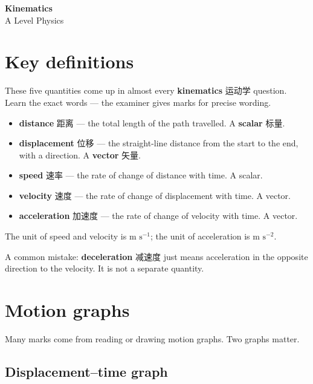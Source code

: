 \documentclass[11pt]{article}
\begin{document}
\begin{center}
  {\LARGE\bfseries Kinematics}\\[0.35em]
  {\large A Level Physics}
\end{center}
\vspace{0.6em}

\section*{Key definitions}

These five quantities come up in almost every \textbf{kinematics} 运动学 question. Learn the exact words — the examiner gives marks for precise wording.

\begin{itemize}
\item \textbf{distance} 距离 — the total length of the path travelled. A \textbf{scalar} 标量.

\item \textbf{displacement} 位移 — the straight-line distance from the start to the end, with a direction. A \textbf{vector} 矢量.

\item \textbf{speed} 速率 — the rate of change of distance with time. A scalar.

\item \textbf{velocity} 速度 — the rate of change of displacement with time. A vector.

\item \textbf{acceleration} 加速度 — the rate of change of velocity with time. A vector.

\end{itemize}

The unit of speed and velocity is $\text{m s}^{-1}$; the unit of acceleration is $\text{m s}^{-2}$.

A common mistake: \textbf{deceleration} 减速度 just means acceleration in the opposite direction to the velocity. It is not a separate quantity.

\section*{Motion graphs}

Many marks come from reading or drawing motion graphs. Two graphs matter.

\subsection*{Displacement–time graph}
\end{document}
